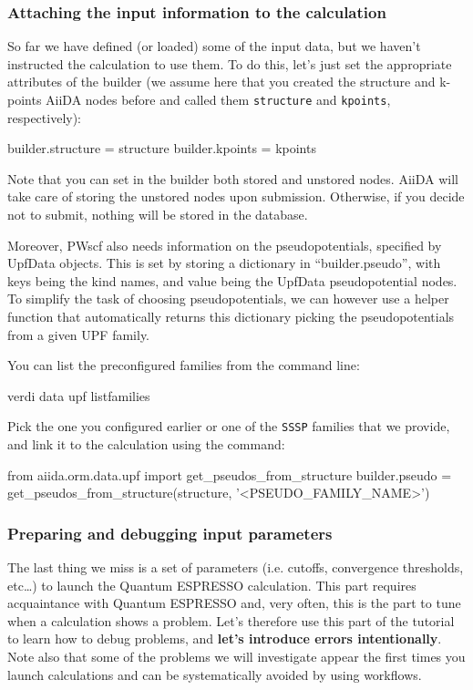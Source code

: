 \subsubsection{Attaching the input information to the calculation}
So far we have defined (or loaded) some of the input data, but we haven't instructed the calculation to use them.
To do this, let's just set the appropriate attributes of the builder (we assume here 
that you created the structure and k-points AiiDA nodes before and called them 
\texttt{structure} and \texttt{kpoints}, respectively):
\begin{pythoncommand}
 builder.structure = structure
 builder.kpoints = kpoints
\end{pythoncommand}
Note that you can set in the builder both stored and unstored nodes.
AiiDA will take care of storing the unstored nodes upon submission. Otherwise,
if you decide not to submit, nothing will be stored in the database.

Moreover, PWscf also needs information on the pseudopotentials, specified by UpfData objects.
This is set by storing a dictionary in ``builder.pseudo'', with keys being the
kind names, and value being the UpfData pseudopotential nodes.
To simplify the task of choosing pseudopotentials, we can however use a helper
function that automatically returns this dictionary picking the pseudopotentials
from a given UPF family.

You can list the preconfigured families from the command line:
\begin{bashcommand}
 verdi data upf listfamilies
\end{bashcommand}
Pick the one you configured earlier or one of the \texttt{SSSP} families that we provide, and link it to the calculation using the command:
\begin{pythoncommand}
 from aiida.orm.data.upf import get_pseudos_from_structure
 builder.pseudo = get_pseudos_from_structure(structure, '<PSEUDO_FAMILY_NAME>')
\end{pythoncommand}



\subsubsection{Preparing and debugging input parameters}
The last thing we miss is a set of parameters (i.e. cutoffs, convergence thresholds, etc\dots) to launch the Quantum ESPRESSO calculation.
This part requires acquaintance with Quantum ESPRESSO and, very often, this is the part to tune when a calculation shows a problem.
Let's therefore use this part of the tutorial to learn how to debug problems, and {\bf let's introduce errors intentionally}.
Note also that some of the problems we will investigate appear the first times you launch calculations and can be systematically avoided by using workflows.


